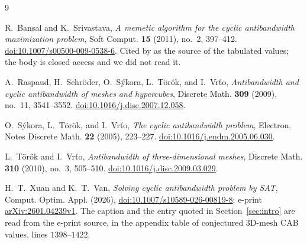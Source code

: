 \documentclass[11pt]{amsart}
\theoremstyle{remark}
\begin{document}
\begin{thebibliography}{9}

R.~Bansal and K.~Srivastava,
\emph{A memetic algorithm for the cyclic antibandwidth maximization problem},
Soft Comput. \textbf{15} (2011), no.~2, 397--412.
\href{https://doi.org/10.1007/s00500-009-0538-6}{doi:10.1007/s00500-009-0538-6}.
Cited by \cite{XT} as the source of the tabulated values; the body is closed access and we did not
read it.

A.~Raspaud, H.~Schr\"oder, O.~S\'ykora, L.~T\"or\"ok, and I.~Vr\v{t}o,
\emph{Antibandwidth and cyclic antibandwidth of meshes and hypercubes},
Discrete Math. \textbf{309} (2009), no.~11, 3541--3552.
\href{https://doi.org/10.1016/j.disc.2007.12.058}{doi:10.1016/j.disc.2007.12.058}.

O.~S\'ykora, L.~T\"or\"ok, and I.~Vr\v{t}o,
\emph{The cyclic antibandwidth problem},
Electron. Notes Discrete Math. \textbf{22} (2005), 223--227.
\href{https://doi.org/10.1016/j.endm.2005.06.030}{doi:10.1016/j.endm.2005.06.030}.

L.~T\"or\"ok and I.~Vr\v{t}o,
\emph{Antibandwidth of three-dimensional meshes},
Discrete Math. \textbf{310} (2010), no.~3, 505--510.
\href{https://doi.org/10.1016/j.disc.2009.03.029}{doi:10.1016/j.disc.2009.03.029}.

H.~T.~Xuan and K.~T.~Van,
\emph{Solving cyclic antibandwidth problem by SAT},
Comput. Optim. Appl. (2026),
\href{https://doi.org/10.1007/s10589-026-00819-8}{doi:10.1007/s10589-026-00819-8};
e-print \href{https://arxiv.org/abs/2601.04239}{arXiv:2601.04239v1}.
The caption and the entry quoted in Section~\ref{sec:intro} are read from the e-print source, in
the appendix table of conjectured $3$D-mesh CAB values, lines $1398$--$1422$.

\end{thebibliography}
\end{document}
